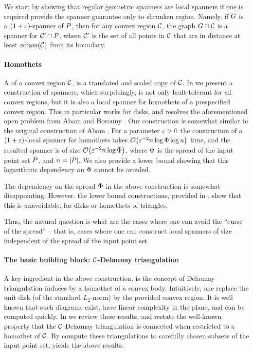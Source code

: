 \documentclass[12pt]{article}%
\begin{document}
We start by showing that regular geometric spanners are local spanners
if one is required provide the spanner guarantee only to shrunken
region. Namely, if $G$ is a $(1+\varepsilon)$-spanner of $P$, then for any
convex region $\mathcal{C}$, the graph $ G \cap {\mathcal{C}}$ is a spanner
for $\mathcal{C}' \cap P$, where $\mathcal{C}'$ is the set of all points in
$\mathcal{C}$ that are in distance at least $\eps \diamX{\Body}$ from its
boundary.

\paragraph{Homothets}
A  of a convex region $\mathcal{C}$, is a translated and
scaled copy of $\mathcal{C}$.  In  we present a construction
of spanners, which surprisingly, is not only fault-tolerant for all
convex regions, but it is also a local spanner for homothets of a
prespecified convex region.  This in particular works for disks, and
resolves the aforementioned open problem from Abam and Borouny
\cite{ab-lgs-21}. Our construction is somewhat similar to the original
construction of Abam \etal \cite{abfg-rftgs-09}. For a parameter
$\varepsilon>0$ the construction of a $(1+\varepsilon)$-local spanner for homothets
takes $\Of\pth{ \eps^{-2} n\log \spread \log n }$ time, and the
resulted spanner is of size $\Of\pth{ \eps^{-2} n\log \spread }$,
where $\Phi$ is the spread of the input point set $P$, and
$n=|P|$. We also provide a lower bound showing that this logarithmic
dependency on $\Phi$ cannot be avoided.

The dependency on the spread $\Phi$ in the above construction is
somewhat disappointing. However.  the lower bound constructions,
provided in , show that this is unavoidable, for
disks or homothets of triangles.


Thus, the natural question is what are the cases where one can avoid
the ``curse of the spread'' -- that is, cases where one can construct
local spanners of size independent of the spread of the input point
set.

\paragraph{The basic building block: $\mathcal{C}$-Delaunay triangulation}

A key ingredient in the above construction, is the concept of Delaunay
triangulation induces by a homothet of a convex body. Intuitively, one
replace the unit disk (of the standard $L_2$-norm) by the provided
convex region. It is well known \cite{cd-vdbcdf-85} that such diagrams
exist, have linear complexity in the plane, and can be computed
quickly.  In  we review these results, and
restate the well-known property that the $\mathcal{C}$-Delaunay
triangulation is connected when restricted to a homothet of $\mathcal{C}$.
By compute these triangulations to carefully chosen subsets of the
input point set, yields the above results.
\end{document}
